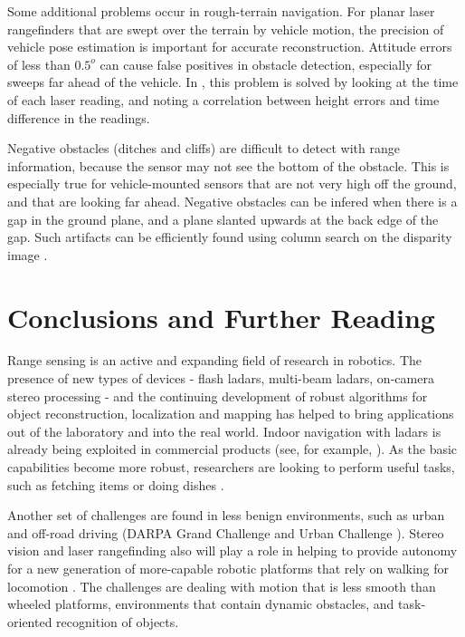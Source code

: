 \documentclass[twocolumn,oneside]{book}
\begin{document}
Some additional problems occur in  rough-terrain navigation.  For
planar laser rangefinders that are swept over the terrain by vehicle
motion, the precision of vehicle pose estimation is important for
accurate reconstruction.  Attitude errors of less than $0.5^o$ can
cause false positives in obstacle detection, especially for sweeps far
ahead of the vehicle.  In \cite{thrun06}, this problem is solved by
looking at the time of each laser reading, and noting a correlation
between height errors and time difference in the readings.

Negative  obstacles (ditches and cliffs) are difficult to detect with
range information, because the sensor may not see the bottom of the
obstacle.  This is especially true for vehicle-mounted sensors that
are not very high off the ground, and that are looking far ahead.
Negative obstacles can be infered when there is a gap in the ground
plane, and a plane slanted upwards at the back edge of the gap.  Such
artifacts can be efficiently found using column search on the
disparity image \cite{bellutta00}.

\section{Conclusions and Further Reading}

Range sensing is an active and expanding field of research in
robotics.  The presence of new types of devices - flash ladars,
multi-beam ladars, on-camera stereo processing - and the continuing
development of robust algorithms for object reconstruction,
localization and mapping has helped to bring applications out of the
laboratory and into the real world.  Indoor navigation with ladars is
already being exploited in commercial products (see, for example,
\cite{karto}).  As the basic capabilities become more robust,
researchers are looking to perform useful tasks, such as fetching
items or doing dishes \cite{STAIR}.

Another set of challenges are found in less benign
environments, such as urban and off-road driving (DARPA Grand
Challenge and Urban Challenge \cite{GrandChallenge}).  Stereo vision
and laser rangefinding also will play a role in helping to provide
autonomy for a new generation of more-capable robotic platforms that
rely on walking for locomotion \cite{cmu-humanoid}.  The challenges are
dealing with motion that is less smooth than wheeled platforms,
environments that contain dynamic obstacles, and task-oriented
recognition of objects.  
\end{document}
